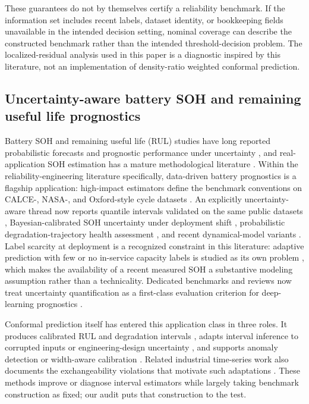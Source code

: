 \documentclass[
  number,
  preprint]{elsarticle}
\begin{document}
These guarantees do not by themselves certify a reliability benchmark.
If the information set includes recent labels, dataset identity, or
bookkeeping fields unavailable in the intended decision setting, nominal
coverage can describe the constructed benchmark rather than the intended
threshold-decision problem. The localized-residual analysis used in this
paper is a diagnostic inspired by this literature, not an implementation
of density-ratio weighted conformal prediction.

\subsection{Uncertainty-aware battery SOH and remaining useful life
prognostics}\label{uncertainty-aware-battery-soh-and-remaining-useful-life-prognostics}

Battery SOH and remaining useful life (RUL) studies have long reported
probabilistic forecasts and prognostic performance under uncertainty
\citep{saxena2010evaluating, he2011remaining, liu2020futurecapacity},
and real-application SOH estimation has a mature methodological
literature \citep{berecibar2016critical}. Within the
reliability-engineering literature specifically, data-driven battery
prognostics is a flagship application: high-impact estimators define the
benchmark conventions on CALCE-, NASA-, and Oxford-style cycle datasets
\citep{wang2023improved, meng2023long, wei2023prediction}. An explicitly
uncertainty-aware thread now reports quantile intervals validated on the
same public datasets \citep{zhang2024reliability}, Bayesian-calibrated
SOH uncertainty under deployment shift \citep{zhu2025bayesian},
probabilistic degradation-trajectory health assessment
\citep{che2024predictive, lin2023battery}, and recent dynamical-model
variants \citep{wang2025remaining}. Label scarcity at deployment is a
recognized constraint in this literature: adaptive prediction with few
or no in-service capacity labels is studied as its own problem
\citep{zhang2022adaptive, pan2024probabilistic}, which makes the
availability of a recent measured SOH a substantive modeling assumption
rather than a technicality. Dedicated benchmarks and reviews now treat
uncertainty quantification as a first-class evaluation criterion for
deep-learning prognostics
\citep{basora2025benchmark, lin2026recent, nemani2023uncertainty, salinascamus2025comprehensive}.

Conformal prediction itself has entered this application class in three
roles. It produces calibrated RUL and degradation intervals
\citep{xu2026uncertaintyaware, liu2026credible, javanmardi2023conformal, piao2025crulp, soon2026enhancing},
adapts interval inference to corrupted inputs or engineering-design
uncertainty \citep{wang2025robust, wu2026sequential}, and supports
anomaly detection or width-aware calibration
\citep{yuan2026conformal, xu2026widthoptimized}. Related industrial
time-series work also documents the exchangeability violations that
motivate such adaptations \citep{zhang2025uncertainty}. These methods
improve or diagnose interval estimators while largely taking benchmark
construction as fixed; our audit puts that construction to the test.
\end{document}
